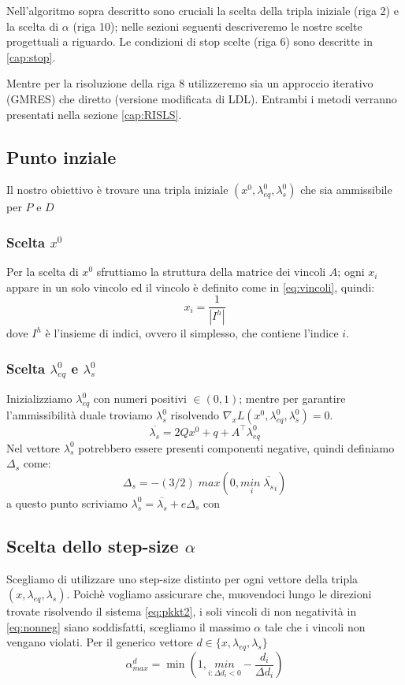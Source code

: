 Nell'algoritmo sopra descritto sono cruciali la scelta della tripla iniziale (riga 2) e la scelta di $\alpha$ (riga 10); nelle sezioni seguenti descriveremo le nostre scelte progettuali a riguardo.
Le condizioni di stop scelte (riga 6) sono descritte in \ref{cap:stop}.

Mentre per la risoluzione della riga 8 utilizzeremo sia un approccio iterativo (GMRES) che diretto (versione modificata di LDL).
Entrambi i metodi verranno presentati nella sezione \ref{cap:RISLS}.
\newpage
\subsection{Punto inziale}\label{cap:sp}
Il nostro obiettivo è trovare una tripla iniziale $(x^0, \lambda_{eq}^0, \lambda_s^0)$ che sia ammissibile per $P$ e $D$

\subsubsection*{Scelta $x^0$}
Per la scelta di $x^0$ sfruttiamo la struttura della matrice dei vincoli $A$; ogni $x_i$ appare in un solo vincolo ed il vincolo è definito come in \ref{eq:vincoli}, quindi: $$x_i=\frac{1}{|I^h|}$$
dove $I^h$ è l'insieme di indici, ovvero il simplesso, che contiene l'indice $i$.

\subsubsection*{Scelta $\lambda^0_{eq}$ e $\lambda^0_{s}$}
Inizializziamo $\lambda^0_{eq}$ con numeri positivi $\in (0,1)$; mentre per garantire l'ammissibilità duale troviamo $\lambda^0_s$ risolvendo 
$\nabla _x L(x^0, \lambda_{eq}^0, \lambda_s^0) = 0$.
$$\overline{\lambda_s} = 2Qx^0+q+A^\intercal\lambda_{eq}^0$$
Nel vettore $\lambda_s^0$ potrebbero essere presenti componenti negative, quindi definiamo $\Delta_s$ come:
$$\Delta_s = -(3/2)\;max(0, \underset{i}{min\;}\overline{\lambda_s}_i)$$
a questo punto scriviamo $\lambda_s^0 = \overline{\lambda_s} + e \Delta_s$ con 


\subsection{Scelta dello step-size $\alpha$}
Scegliamo di utilizzare uno step-size distinto per ogni vettore della tripla $(x, \lambda_{eq}, \lambda_s)$.
Poichè vogliamo assicurare che, muovendoci lungo le direzioni trovate risolvendo il sistema \ref{eq:pkkt2}, i soli vincoli di non negatività in \ref{eq:nonneg} siano soddisfatti, scegliamo il massimo $\alpha$ tale che i vincoli non vengano violati.
Per il generico vettore $d \in \{x,\lambda_{eq},\lambda_s\} $ 
\begin{equation}\label{eq:alpha}
    \alpha^d_{max} = \min (1, \underset{i:\Delta d_i < 0}{min}-\frac{d_i}{\Delta d_i})
\end{equation}

